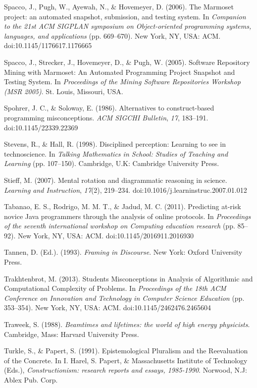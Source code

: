 Spacco, J., Pugh, W., Ayewah, N., \& Hovemeyer, D. (2006). The Marmoset
project: an automated snapshot, submission, and testing system. In
\emph{Companion to the 21st ACM SIGPLAN symposium on Object-oriented
programming systems, languages, and applications} (pp. 669--670). New
York, NY, USA: ACM. doi:10.1145/1176617.1176665

Spacco, J., Strecker, J., Hovemeyer, D., \& Pugh, W. (2005). Software
Repository Mining with Marmoset: An Automated Programming Project
Snapshot and Testing System. In \emph{Proceedings of the Mining Software
Repositories Workshop (MSR 2005)}. St. Louis, Missouri, USA.

Spohrer, J. C., \& Soloway, E. (1986). Alternatives to construct-based
programming misconceptions. \emph{ACM SIGCHI Bulletin}, \emph{17},
183--191. doi:10.1145/22339.22369

Stevens, R., \& Hall, R. (1998). Disciplined perception: Learning to see
in technoscience. In \emph{Talking Mathematics in School: Studies of
Teaching and Learning} (pp. 107--150). Cambridge, U.K: Cambridge
University Press.

Stieff, M. (2007). Mental rotation and diagrammatic reasoning in
science. \emph{Learning and Instruction}, \emph{17}(2), 219--234.
doi:10.1016/j.learninstruc.2007.01.012

Tabanao, E. S., Rodrigo, M. M. T., \& Jadud, M. C. (2011). Predicting
at-risk novice Java programmers through the analysis of online
protocols. In \emph{Proceedings of the seventh international workshop on
Computing education research} (pp. 85--92). New York, NY, USA: ACM.
doi:10.1145/2016911.2016930

Tannen, D. (Ed.). (1993). \emph{Framing in Discourse}. New York: Oxford
University Press.

Trakhtenbrot, M. (2013). Students Misconceptions in Analysis of
Algorithmic and Computational Complexity of Problems. In
\emph{Proceedings of the 18th ACM Conference on Innovation and
Technology in Computer Science Education} (pp. 353--354). New York, NY,
USA: ACM. doi:10.1145/2462476.2465604

Traweek, S. (1988). \emph{Beamtimes and lifetimes: the world of high
energy physicists}. Cambridge, Mass: Harvard University Press.

Turkle, S., \& Papert, S. (1991). Epistemological Pluralism and the
Reevaluation of the Concrete. In I. Harel, S. Papert, \& Massachusetts
Institute of Technology (Eds.), \emph{Constructionism: research reports
and essays, 1985-1990}. Norwood, N.J: Ablex Pub. Corp.

